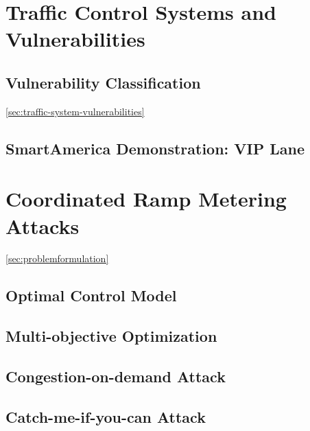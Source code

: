 \section{Traffic Control Systems and Vulnerabilities}


\subsection{Vulnerability Classification}
\ref{sec:traffic-system-vulnerabilities}

\subsection{SmartAmerica Demonstration: VIP Lane}

\section{Coordinated Ramp Metering Attacks}
\ref{sec:problemformulation}

\subsection{Optimal Control Model}

\subsection{Multi-objective Optimization}

\subsection{Congestion-on-demand Attack}

\subsection{Catch-me-if-you-can Attack}
